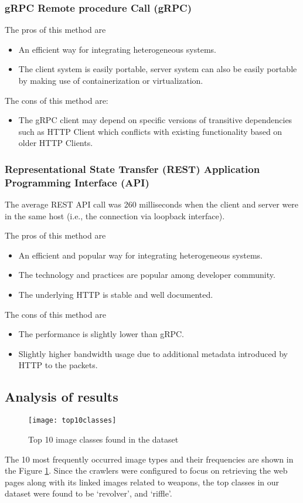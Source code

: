 \subsubsection{gRPC Remote procedure Call (gRPC)} \label{sec:eval-rpc}

The pros of this method are
\begin{itemize}
\item An efficient way for integrating heterogeneous systems.
\item The client system is easily portable, server system can also be easily portable by making use of containerization or virtualization.
\end{itemize}

The cons of this method are:
\begin{itemize}
  \item The gRPC client may depend on specific versions of transitive dependencies such as HTTP Client which conflicts with existing functionality based on older HTTP Clients.
\end{itemize}

\subsubsection{Representational State Transfer (REST) Application Programming Interface (API)} \label{sec:eval-rest}

The average REST API call was 260 milliseconds when the client and server were in the same host (i.e., the connection via loopback interface).

The pros of this method are
\begin{itemize}
\item An efficient and popular way for integrating heterogeneous systems.
\item The technology and practices are popular among developer community.
\item The underlying HTTP is stable and well documented.
\end{itemize}

The cons of this method are
\begin{itemize}
\item The performance is slightly lower than gRPC.
\item Slightly higher bandwidth usage due to additional metadata introduced by HTTP to the packets.
\end{itemize}

\subsection{Analysis of results}

\begin{figure}[h]
	\texttt{[image: top10classes]}
	\caption{Top 10 image classes found in the dataset}
	\label{fig:top10ImgClass}
\end{figure}
The 10 most frequently occurred image types and their frequencies are shown in the Figure \ref{fig:top10ImgClass}. Since the crawlers were configured to focus on retrieving the web pages along with its linked images related to weapons, the top classes in our dataset were found to be `revolver', and `riffle'.
